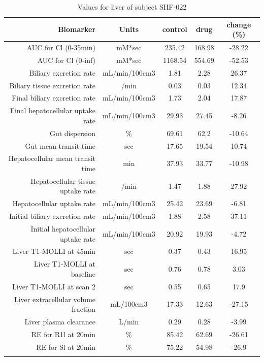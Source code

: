 \documentclass{epflreport}%
\begin{document}
%
\clearpage%
\begin{longtable}{rcccc}%
\hline%
Biomarker&Units&control&drug&change (\%)\\%
\hline%
AUC for Cl (0{-}35min)&mM*sec&235.42&168.98&{-}28.22\\%
AUC for Cl (0{-}inf)&mM*sec&1168.54&554.69&{-}52.53\\%
Biliary excretion rate&mL/min/100cm3&1.81&2.28&26.37\\%
Biliary tissue excretion rate&/min&0.03&0.03&12.34\\%
Final biliary excretion rate&mL/min/100cm3&1.73&2.04&17.87\\%
Final hepatocellular uptake rate&mL/min/100cm3&29.93&27.45&{-}8.26\\%
Gut dispersion&\%&69.61&62.2&{-}10.64\\%
Gut mean transit time&sec&17.65&19.54&10.74\\%
Hepatocellular mean transit time&min&37.93&33.77&{-}10.98\\%
Hepatocellular tissue uptake rate&/min&1.47&1.88&27.92\\%
Hepatocellular uptake rate&mL/min/100cm3&25.42&23.69&{-}6.81\\%
Initial biliary excretion rate&mL/min/100cm3&1.88&2.58&37.11\\%
Initial hepatocellular uptake rate&mL/min/100cm3&20.92&19.93&{-}4.72\\%
Liver T1{-}MOLLI at 45min&sec&0.37&0.43&16.95\\%
Liver T1{-}MOLLI at baseline&sec&0.76&0.78&3.03\\%
Liver T1{-}MOLLI at scan 2&sec&0.55&0.65&17.9\\%
Liver extracellular volume fraction&mL/100cm3&17.33&12.63&{-}27.15\\%
Liver plasma clearance&L/min&0.29&0.28&{-}3.99\\%
RE for R1l at 20min&\%&85.42&62.69&{-}26.61\\%
RE for Sl at 20min&\%&75.22&54.98&{-}26.9\\%
\hline%
\caption{Values for liver of subject SHF-022} \\%
\end{longtable}%
\end{document}
